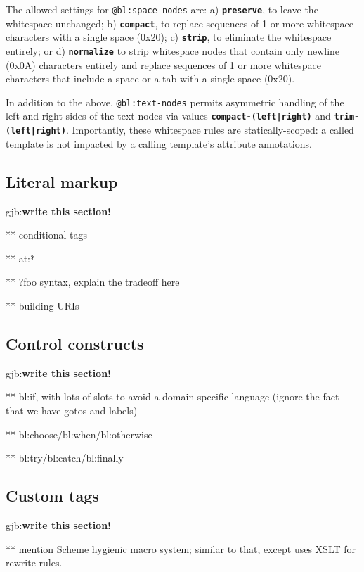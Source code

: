 \documentclass{www2003-submission}
\newcommand{\smtexttt}[1]{{\small\texttt{#1}}}
\newcommand{\gjb}[1]{{\sc gjb:}\textbf{#1}}
\begin{document}
The allowed settings for \smtexttt{@bl:space-nodes} are: a)
\textbf{\smtexttt{preserve}}, to leave the whitespace unchanged; b)       
\textbf{\smtexttt{compact}}, to replace sequences of 1 or more
      whitespace characters with a single space (0x20); c)      
\textbf{\smtexttt{strip}}, to eliminate the whitespace entirely; or d)
\textbf{\smtexttt{normalize}} to strip whitespace nodes that contain only
newline (0x0A) characters entirely and replace sequences of 1 or more
whitespace characters that include a space or a tab with a single
space (0x20).

In addition to the above, \smtexttt{@bl:text-nodes} permits asymmetric
handling of the left and right sides of the text nodes via values
\textbf{\smtexttt{compact-(left|right)}} and \textbf{\smtexttt{trim-(left|right)}}. 
Importantly, these whitespace rules are statically-scoped: a called
template is not impacted by a calling template's attribute
annotations.

\subsection{Literal markup}
\label{ssec-literal-markup}

\gjb{write this section!}

** conditional tags

** at:*

** ?foo syntax, explain the tradeoff here

** building URIs

\subsection{Control constructs}
\label{ssec-control}

\gjb{write this section!}

** bl:if, with lots of slots to avoid a domain specific language
(ignore the fact that we have gotos and labels)

** bl:choose/bl:when/bl:otherwise

** bl:try/bl:catch/bl:finally

\subsection{Custom tags}
\label{ssec-custom-tags}

\gjb{write this section!}

** mention Scheme hygienic macro system; similar to that, except uses
XSLT for rewrite rules.
\end{document}
